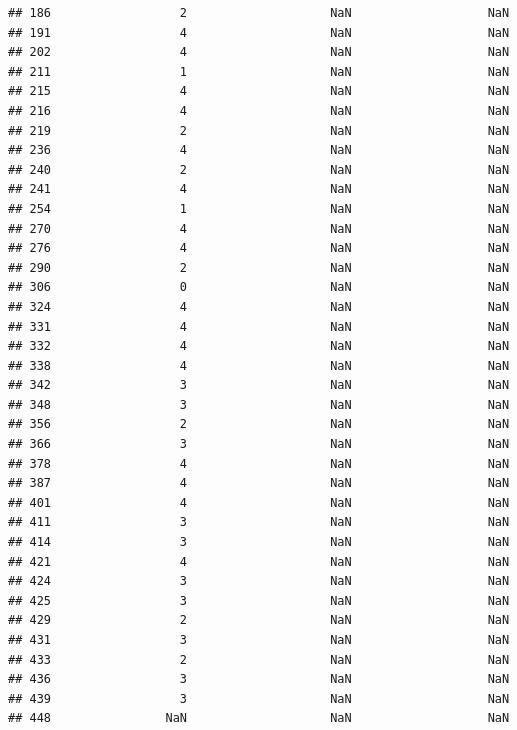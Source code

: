 \documentclass[
]{article}
\begin{document}
\begin{verbatim}
## 186                  2                    NaN                   NaN
## 191                  4                    NaN                   NaN
## 202                  4                    NaN                   NaN
## 211                  1                    NaN                   NaN
## 215                  4                    NaN                   NaN
## 216                  4                    NaN                   NaN
## 219                  2                    NaN                   NaN
## 236                  4                    NaN                   NaN
## 240                  2                    NaN                   NaN
## 241                  4                    NaN                   NaN
## 254                  1                    NaN                   NaN
## 270                  4                    NaN                   NaN
## 276                  4                    NaN                   NaN
## 290                  2                    NaN                   NaN
## 306                  0                    NaN                   NaN
## 324                  4                    NaN                   NaN
## 331                  4                    NaN                   NaN
## 332                  4                    NaN                   NaN
## 338                  4                    NaN                   NaN
## 342                  3                    NaN                   NaN
## 348                  3                    NaN                   NaN
## 356                  2                    NaN                   NaN
## 366                  3                    NaN                   NaN
## 378                  4                    NaN                   NaN
## 387                  4                    NaN                   NaN
## 401                  4                    NaN                   NaN
## 411                  3                    NaN                   NaN
## 414                  3                    NaN                   NaN
## 421                  4                    NaN                   NaN
## 424                  3                    NaN                   NaN
## 425                  3                    NaN                   NaN
## 429                  2                    NaN                   NaN
## 431                  3                    NaN                   NaN
## 433                  2                    NaN                   NaN
## 436                  3                    NaN                   NaN
## 439                  3                    NaN                   NaN
## 448                NaN                    NaN                   NaN

\end{verbatim}
\end{document}
